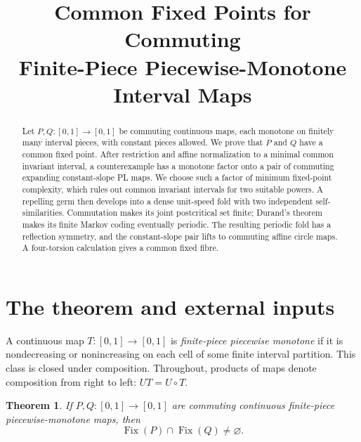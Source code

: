 \documentclass[11pt]{article}
\title{Common Fixed Points for Commuting\\Finite-Piece Piecewise-Monotone Interval Maps}
\author{}
\date{}
\newtheorem{theorem}{Theorem}
\newcommand{\I}{[0,1]}
\newcommand{\Fix}{\operatorname{Fix}}
\begin{document}
\maketitle

\begin{abstract}
Let $P,Q:\I\to\I$ be commuting continuous maps, each monotone on finitely many
interval pieces, with constant pieces allowed. We prove that $P$ and $Q$ have a common fixed point.
After restriction and affine normalization to a minimal common invariant interval, a counterexample
has a monotone factor onto a pair of commuting expanding constant-slope PL maps. We choose such a
factor of minimum fixed-point complexity, which rules out common invariant intervals for two suitable
powers. A repelling germ then develops into a dense unit-speed fold with two independent
self-similarities. Commutation makes its joint postcritical set finite; Durand's theorem makes its finite
Markov coding eventually periodic. The resulting periodic fold has a reflection symmetry, and the
constant-slope pair lifts to commuting affine circle maps. A four-torsion calculation gives a common fixed fibre.
\end{abstract}

\section{The theorem and external inputs}

A continuous map $T:\I\to\I$ is \emph{finite-piece piecewise monotone} if it is nondecreasing or
nonincreasing on each cell of some finite interval partition. This class is closed under composition.
Throughout, products of maps denote composition from right to left: $UT=U\circ T$.

\begin{theorem}\label{thm:main}
If $P,Q:\I\to\I$ are commuting continuous finite-piece piecewise-monotone maps, then
\[
\Fix(P)\cap\Fix(Q)\ne\varnothing.
\]
\end{theorem}
\end{document}
